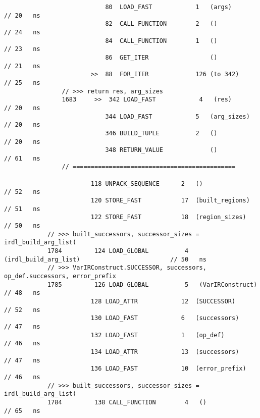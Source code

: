 \begin{code}
\begin{verbatim}
                            80  LOAD_FAST            1   (args)                                     // 20   ns
                            82  CALL_FUNCTION        2   ()                                         // 24   ns
                            84  CALL_FUNCTION        1   ()                                         // 23   ns
                            86  GET_ITER                 ()                                         // 21   ns
                        >>  88  FOR_ITER             126 (to 342)                                   // 25   ns
                // >>> return res, arg_sizes
                1683     >>  342 LOAD_FAST            4   (res)                                     // 20   ns
                            344 LOAD_FAST            5   (arg_sizes)                                // 20   ns
                            346 BUILD_TUPLE          2   ()                                         // 20   ns
                            348 RETURN_VALUE             ()                                         // 61   ns
                // =============================================

                        118 UNPACK_SEQUENCE      2   ()                                             // 52   ns
                        120 STORE_FAST           17  (built_regions)                                // 51   ns
                        122 STORE_FAST           18  (region_sizes)                                 // 50   ns
            // >>> built_successors, successor_sizes = irdl_build_arg_list(
            1784         124 LOAD_GLOBAL          4   (irdl_build_arg_list)                         // 50   ns
            // >>> VarIRConstruct.SUCCESSOR, successors, op_def.successors, error_prefix
            1785         126 LOAD_GLOBAL          5   (VarIRConstruct)                              // 48   ns
                        128 LOAD_ATTR            12  (SUCCESSOR)                                    // 52   ns
                        130 LOAD_FAST            6   (successors)                                   // 47   ns
                        132 LOAD_FAST            1   (op_def)                                       // 46   ns
                        134 LOAD_ATTR            13  (successors)                                   // 47   ns
                        136 LOAD_FAST            10  (error_prefix)                                 // 46   ns
            // >>> built_successors, successor_sizes = irdl_build_arg_list(
            1784         138 CALL_FUNCTION        4   ()                                            // 65   ns


\end{verbatim}
\end{code}

